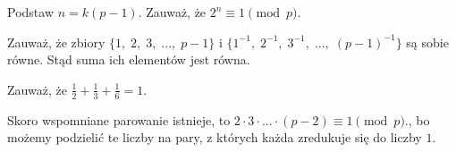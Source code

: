 

\begin{hints_list}
	\item Podstaw $n = k(p - 1)$. Zauważ, że $2^n \equiv 1 \pmod{p}$. 
	\item Zauważ, że zbiory $\{1, \; 2, \; 3, \; ..., \; p - 1\} $ i $\{1^{-1},\; 2^{-1},\; 3^{-1},\; ..., \;(p - 1)^{-1}\}$ są sobie równe. Stąd suma ich elementów jest równa.
	\item Zauważ, że $\frac{1}{2} + \frac{1}{3} + \frac{1}{6} = 1$.
	\item Skoro wspomniane parowanie istnieje, to 
	$
		2 \cdot 3 \cdot ... \cdot (p - 2) \equiv 1 \pmod{p}.
	$,
	bo możemy podzielić te liczby na pary, z których każda zredukuje się do liczby $1$.
\end{hints_list}